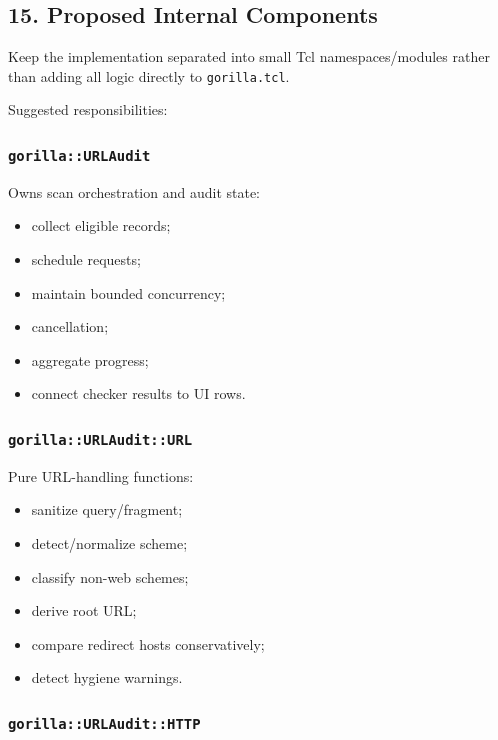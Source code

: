 \documentclass[
  letterpaper,
]{article}
\providecommand{\tightlist}{%
  \setlength{\itemsep}{0pt}\setlength{\parskip}{0pt}}
\begin{document}
\subsection{15. Proposed Internal Components}\label{15-proposed-internal-components}

Keep the implementation separated into small Tcl namespaces/modules rather than adding all logic directly to
\nolinkurl{gorilla.tcl}.

Suggested responsibilities:

\subsubsection{\texorpdfstring{\nolinkurl{gorilla::URLAudit}}{}}\label{gorillaurlaudit}

Owns scan orchestration and audit state:

\begin{itemize}
\tightlist
\item
  collect eligible records;
\item
  schedule requests;
\item
  maintain bounded concurrency;
\item
  cancellation;
\item
  aggregate progress;
\item
  connect checker results to UI rows.
\end{itemize}

\subsubsection{\texorpdfstring{\nolinkurl{gorilla::URLAudit::URL}}{}}\label{gorillaurlauditurl}

Pure URL-handling functions:

\begin{itemize}
\tightlist
\item
  sanitize query/fragment;
\item
  detect/normalize scheme;
\item
  classify non-web schemes;
\item
  derive root URL;
\item
  compare redirect hosts conservatively;
\item
  detect hygiene warnings.
\end{itemize}

\subsubsection{\texorpdfstring{\nolinkurl{gorilla::URLAudit::HTTP}}{}}\label{gorillaurlaudithttp}
\end{document}
